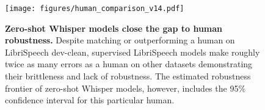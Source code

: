 
\begin{figure}[t]
\begin{center}
\centerline{\texttt{[image: figures/human\_comparison\_v14.pdf]}}
\caption{\textbf{Zero-shot Whisper models close the gap to human robustness.} Despite matching or outperforming a human on LibriSpeech dev-clean, supervised LibriSpeech models make roughly twice as many errors as a human on other datasets demonstrating their brittleness and lack of robustness. The estimated robustness frontier of zero-shot Whisper models, however, includes the 95\% confidence interval for this particular human.}
\label{robustness_figure}
\end{center}
\vspace{-1em}
\end{figure}

